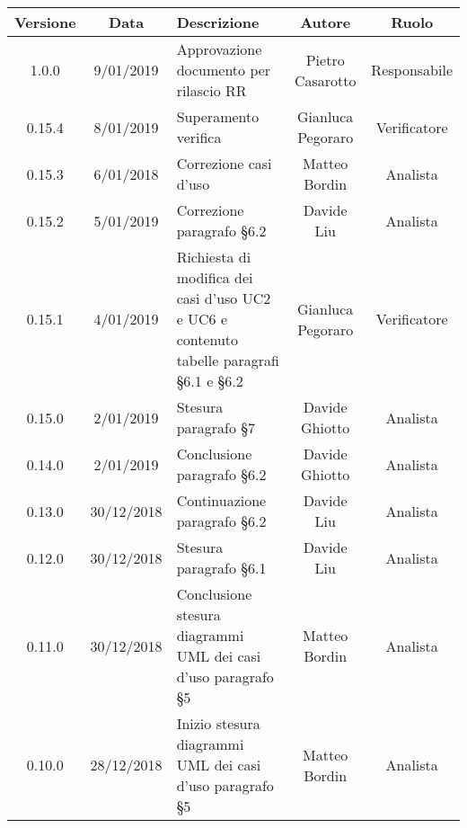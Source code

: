 \begin{table}[!htbp]
            \centering
            \renewcommand{\arraystretch}{2}
            \begin{tabular}{|c|c|p{5cm}|c|c|} %
                \rowcolor{orange!50} %
        		\hline
        		\textbf{Versione} & \textbf{Data} & \textbf{Descrizione} & \textbf{Autore} & \textbf{Ruolo} \\
                \hline
                1.0.0 & 9/01/2019 & Approvazione documento per rilascio RR & Pietro Casarotto & Responsabile \\
                \hline
                0.15.4 & 8/01/2019 & Superamento verifica & Gianluca Pegoraro & Verificatore \\
                \hline
                0.15.3 & 6/01/2018 & Correzione casi d’uso & Matteo Bordin & Analista \\
                \hline
                0.15.2 & 5/01/2019 & Correzione paragrafo §6.2 & Davide Liu & Analista \\
                \hline
                0.15.1 & 4/01/2019 & Richiesta di modifica dei casi d’uso UC2 e UC6 e contenuto tabelle paragrafi §6.1 e §6.2 & Gianluca Pegoraro & Verificatore \\
                \hline
                0.15.0 & 2/01/2019 & Stesura paragrafo §7 & Davide Ghiotto & Analista \\
                \hline
                0.14.0 & 2/01/2019 & Conclusione paragrafo §6.2 & Davide Ghiotto & Analista \\
                \hline
                0.13.0 & 30/12/2018 & Continuazione paragrafo §6.2 & Davide Liu & Analista \\
                \hline
                0.12.0 & 30/12/2018 & Stesura paragrafo §6.1 & Davide Liu & Analista \\
                \hline
                0.11.0 & 30/12/2018 & Conclusione stesura diagrammi UML dei casi d’uso paragrafo §5 & Matteo Bordin & Analista \\
                \hline
               0.10.0 & 28/12/2018 & Inizio stesura diagrammi UML dei casi d'uso paragrafo §5 & Matteo Bordin & Analista \\
                \hline
                
        \end{tabular}
\end{table}

